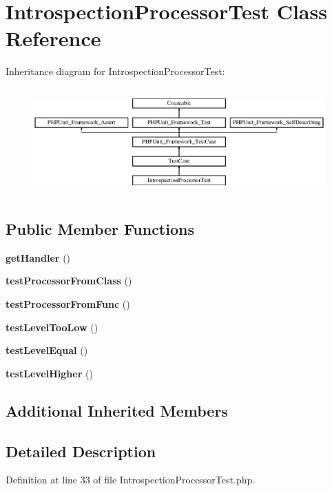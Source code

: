\section{Introspection\+Processor\+Test Class Reference}
\label{class_monolog_1_1_processor_1_1_introspection_processor_test}
Inheritance diagram for Introspection\+Processor\+Test\+:\begin{figure}[H]
\begin{center}
\leavevmode
\includegraphics[height=4.129793cm]{class_monolog_1_1_processor_1_1_introspection_processor_test}
\end{center}
\end{figure}
\subsection*{Public Member Functions}
\begin{DoxyCompactItemize}
\item 
{\bf get\+Handler} ()
\item 
{\bf test\+Processor\+From\+Class} ()
\item 
{\bf test\+Processor\+From\+Func} ()
\item 
{\bf test\+Level\+Too\+Low} ()
\item 
{\bf test\+Level\+Equal} ()
\item 
{\bf test\+Level\+Higher} ()
\end{DoxyCompactItemize}
\subsection*{Additional Inherited Members}


\subsection{Detailed Description}


Definition at line 33 of file Introspection\+Processor\+Test.\+php.



